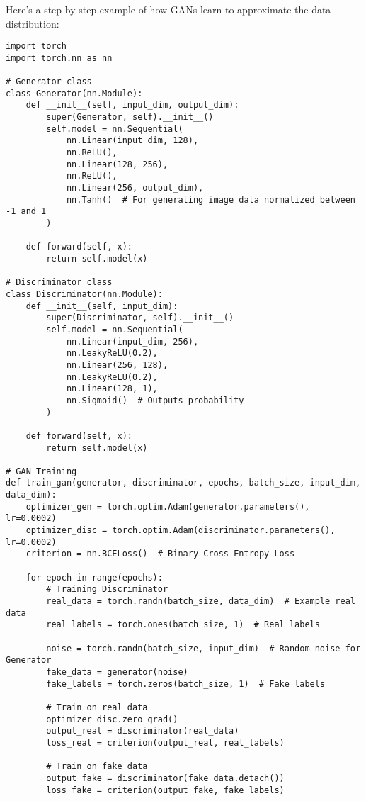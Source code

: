 Here's a step-by-step example of how GANs learn to approximate the data distribution:

\begin{lstlisting}[style=python]
import torch
import torch.nn as nn

# Generator class
class Generator(nn.Module):
    def __init__(self, input_dim, output_dim):
        super(Generator, self).__init__()
        self.model = nn.Sequential(
            nn.Linear(input_dim, 128),
            nn.ReLU(),
            nn.Linear(128, 256),
            nn.ReLU(),
            nn.Linear(256, output_dim),
            nn.Tanh()  # For generating image data normalized between -1 and 1
        )

    def forward(self, x):
        return self.model(x)

# Discriminator class
class Discriminator(nn.Module):
    def __init__(self, input_dim):
        super(Discriminator, self).__init__()
        self.model = nn.Sequential(
            nn.Linear(input_dim, 256),
            nn.LeakyReLU(0.2),
            nn.Linear(256, 128),
            nn.LeakyReLU(0.2),
            nn.Linear(128, 1),
            nn.Sigmoid()  # Outputs probability
        )

    def forward(self, x):
        return self.model(x)

# GAN Training
def train_gan(generator, discriminator, epochs, batch_size, input_dim, data_dim):
    optimizer_gen = torch.optim.Adam(generator.parameters(), lr=0.0002)
    optimizer_disc = torch.optim.Adam(discriminator.parameters(), lr=0.0002)
    criterion = nn.BCELoss()  # Binary Cross Entropy Loss
    
    for epoch in range(epochs):
        # Training Discriminator
        real_data = torch.randn(batch_size, data_dim)  # Example real data
        real_labels = torch.ones(batch_size, 1)  # Real labels
        
        noise = torch.randn(batch_size, input_dim)  # Random noise for Generator
        fake_data = generator(noise)
        fake_labels = torch.zeros(batch_size, 1)  # Fake labels
        
        # Train on real data
        optimizer_disc.zero_grad()
        output_real = discriminator(real_data)
        loss_real = criterion(output_real, real_labels)
        
        # Train on fake data
        output_fake = discriminator(fake_data.detach())
        loss_fake = criterion(output_fake, fake_labels)
        

\end{lstlisting}
